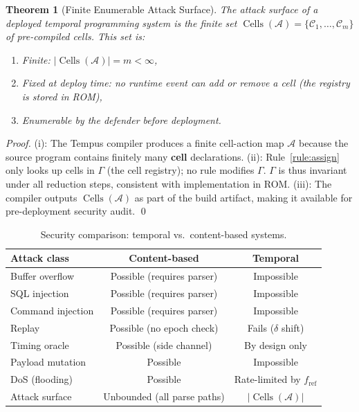 \documentclass[twocolumn,10pt]{article}
\newtheorem{theorem}{Theorem}[section]
\newcommand{\fref}{f_{\mathrm{ref}}}
\newcommand{\calC}{\mathcal{C}}     %
\DeclareMathOperator{\Cells}{Cells}
\begin{document}
\begin{theorem}[Finite Enumerable Attack Surface]
\label{thm:surface}
The attack surface of a deployed temporal programming system is the
finite set $\Cells(\mathcal{A}) = \{\calC_1, \ldots, \calC_m\}$ of
pre-compiled cells. This set is:
\begin{enumerate}[leftmargin=1.5em,topsep=2pt,itemsep=1pt]
  \item[(i)] \emph{Finite}: $|\Cells(\mathcal{A})| = m < \infty$,
  \item[(ii)] \emph{Fixed at deploy time}: no runtime event can add
    or remove a cell (the registry is stored in ROM),
  \item[(iii)] \emph{Enumerable by the defender} before deployment.
\end{enumerate}
\end{theorem}
\begin{proof}
(i): The Tempus compiler produces a finite cell-action map $\mathcal{A}$
because the source program contains finitely many \textbf{cell}
declarations. (ii): Rule~\eqref{rule:assign} only looks up cells in
$\Gamma$ (the cell registry); no rule modifies $\Gamma$. $\Gamma$
is thus invariant under all reduction steps, consistent with
implementation in ROM. (iii): The compiler outputs $\Cells(\mathcal{A})$
as part of the build artifact, making it available for pre-deployment
security audit. \qed
\end{proof}

\begin{table}[ht]
\centering
\caption{Security comparison: temporal vs.\ content-based systems.}
\label{tab:security}
\small
\begin{tabular}{@{}lcc@{}}
\toprule
\textbf{Attack class} & \textbf{Content-based} & \textbf{Temporal} \\
\midrule
Buffer overflow     & Possible (requires parser)  & Impossible \\
SQL injection       & Possible (requires parser)  & Impossible \\
Command injection   & Possible (requires parser)  & Impossible \\
Replay              & Possible (no epoch check)   & Fails ($\delta$ shift) \\
Timing oracle       & Possible (side channel)     & By design only \\
Payload mutation    & Possible                    & Impossible \\
DoS (flooding)      & Possible                    & Rate-limited by $\fref$ \\
Attack surface      & Unbounded (all parse paths) & $|\Cells(\mathcal{A})|$ \\
\bottomrule
\end{tabular}
\end{table}
\end{document}
